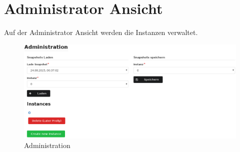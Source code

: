 \section{Administrator Ansicht}

Auf der Administrator Ansicht werden die Instanzen verwaltet.

\begin{figure}[ht]
  \centering
  \includegraphics[width=\textwidth]{fig/admin.png}
  \caption{Administration}
\end{figure}

